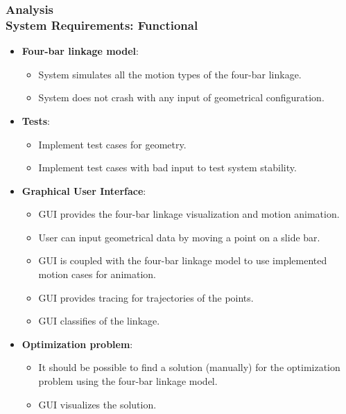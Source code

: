 \documentclass[ucs,10pt]{beamer}
\begin{document}
\begin{frame}
	\frametitle{Analysis \\
		\small \color{rwth-blue} System Requirements: Functional}
	\begin{itemize}
		\item \textbf{Four-bar linkage model}:
		\begin{itemize}
			\item System simulates all the motion types of the four-bar linkage.
			\item System does not crash with any input of geometrical configuration.
		\end{itemize}
		\item \textbf{Tests}:
		\begin{itemize}
			\item Implement test cases for geometry.
			\item Implement test cases with bad input to test system stability.
		\end{itemize}
		
		\item \textbf{Graphical User Interface}:
		\begin{itemize}
			\item GUI provides the four-bar linkage visualization and motion animation.
			\item User can input geometrical data by moving a point on a slide bar.
			\item GUI is coupled with the four-bar linkage model to use implemented motion cases for animation.
			\item GUI provides tracing for trajectories of the points.
			\item GUI classifies of the linkage.
		\end{itemize}
		\item \textbf{Optimization problem}:
		\begin{itemize}
			\item It should be possible to find a solution (manually) for the optimization problem using the four-bar linkage model.
			\item GUI visualizes the solution.
		\end{itemize}
	\end{itemize}
\end{frame}
\end{document}
